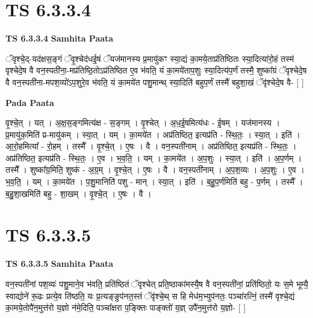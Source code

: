 \documentclass[17pt]{extarticle}
\begin{document}
\section*{ TS 6.3.3.4 }

\textbf{TS 6.3.3.4 } \newline
\textbf{Samhita Paata} \newline

ॅवृश्चे॒द्-यद॑क्षस॒ङ्गं ॅवृ॒श्चेद॑धई॒षं ॅयज॑मानस्य प्र॒मायु॑कꣳ स्या॒द्यं का॒मये॒ताप्र॑तिष्ठितः स्या॒दित्या॑रो॒हं तस्म॑ वृश्चेदे॒ष वै वन॒स्पती॑ना॒-मप्र॑तिष्ठि॒तोऽप्र॑तिष्ठित ए॒व भ॑वति॒ यं का॒मये॑ताप॒शुः स्या॒दित्य॑प॒र्णं तस्मै॒ शुष्का᳚ग्रं ॅवृश्चेदे॒ष वै वन॒स्पती॑ना-मपश॒व्यो॑ऽप॒शुरे॒व भ॑वति॒ यं का॒मये॑त पशु॒मान्थ् स्या॒दिति॑ बहुप॒र्णं तस्मै॑ बहुशा॒खं ॅवृ॑श्चेदे॒ष वै- [  ] \newline

\textbf{Pada Paata} \newline

वृ॒श्चे॒त् । यत् । अ॒क्ष॒स॒ङ्गमित्य॑क्ष - स॒ङ्गम् । वृ॒श्चेत् । अ॒ध॒ई॒षमित्य॑धः - ई॒षम् । यज॑मानस्य । प्र॒मायु॑क॒मिति॑ प्र-मायु॑कम् । स्या॒त् । यम् । का॒मये॑त । अप्र॑तिष्ठित॒ इत्यप्र॑ति - स्थि॒तः॒ । स्या॒त् । इति॑ । आ॒रो॒हमित्या᳚ - रो॒हम् । तस्मै᳚ । वृ॒श्चे॒त् । ए॒षः । वै । वन॒स्पती॑नाम् । अप्र॑तिष्ठित॒ इत्यप्र॑ति - स्थि॒तः॒ । अप्र॑तिष्ठित॒ इत्यप्र॑ति - स्थि॒तः॒ । ए॒व । भ॒व॒ति॒ । यम् । का॒मये॑त । अ॒प॒शुः । स्या॒त् । इति॑ । अ॒प॒र्णम् । तस्मै᳚ । शुष्का᳚ग्र॒मिति॒ शुष्क॑ - अ॒ग्र॒म् । वृ॒श्चे॒त् । ए॒षः । वै । वन॒स्पती॑नाम् । अ॒प॒श॒व्यः । अ॒प॒शुः । ए॒व । भ॒व॒ति॒ । यम् । का॒मये॑त । प॒शु॒मानिति॑ पशु - मान् । स्या॒त् । इति॑ । ब॒हु॒प॒र्णमिति॑ बहु - प॒र्णम् । तस्मै᳚ । ब॒हु॒शा॒खमिति॑ बहु - शा॒खम् । वृ॒श्चे॒त् । ए॒षः । वै ।  \newline




\section*{ TS 6.3.3.5 }

\textbf{TS 6.3.3.5 } \newline
\textbf{Samhita Paata} \newline

वन॒स्पती॑नां पश॒व्यः॑ पशु॒माने॒व भ॑वति॒ प्रति॑ष्ठितं ॅवृश्चेत् प्रति॒ष्ठाका॑मस्यै॒ष वै वन॒स्पती॑नां॒ प्रति॑ष्ठितो॒ यः स॒मे भूम्यै॒ स्वाद्योने॑ रू॒ढः प्रत्ये॒व ति॑ष्ठति॒ यः प्र॒त्यङ्ङुप॑नत॒स्तं ॅवृ॑श्चे॒थ् स हि मेध॑म॒भ्युप॑नतः॒ पञ्चा॑रत्निं॒ तस्मै॑ वृश्चे॒द्यं का॒मये॒तोपै॑न॒मुत्त॑रो य॒ज्ञो न॑मे॒दिति॒ पञ्चा᳚क्षरा प॒ङ्क्तिः पाङ्क्तो॑ य॒ज्ञ् उपै॑न॒मुत्त॑रो य॒ज्ञो- [  ] \newline
\end{document}
